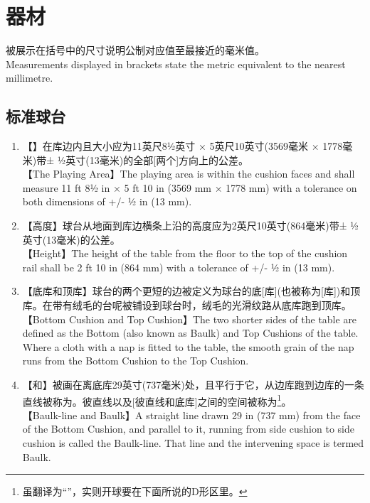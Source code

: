 \section{器材}\label{221}

\noindent 被展示在括号中的尺寸说明公制对应值至最接近的毫米值。\\
Measurements displayed in brackets state the metric equivalent to the nearest millimetre.

\subsection{标准球台}\label{2211}

\begin{enumerate}[label=(\alph*)]
    \item 【\playingarea{}】\playingarea{}在库边\face{}内且大小应为11英尺8½英寸 × 5英尺10英寸(3569毫米 × 1778毫米)带± ½英寸(13毫米)的全部[两个]方向上的公差。\\
    【The Playing Area】The playing area is within the cushion faces and shall measure 11 ft 8½ in × 5 ft 10 in (3569 mm × 1778 mm) with a tolerance on both dimensions of +/- ½ in (13 mm).
    \item 【高度】球台从地面到库边横条上沿的高度应为2英尺10英寸(864毫米)带± ½英寸(13毫米)的公差。\\
    【Height】The height of the table from the floor to the top of the cushion rail shall be 2 ft 10 in (864 mm) with a tolerance of +/- ½ in (13 mm).
    \item 【底库和顶库】球台的两个更短的边被定义为球台的底[库](也被称为\baulk{}[库])和顶库。在带有绒毛的台呢被铺设到球台时，绒毛的光滑纹路从底库跑到顶库。\\
    【Bottom Cushion and Top Cushion】The two shorter sides of the table are defined as the Bottom (also known as Baulk) and Top Cushions of the table. Where a cloth with a nap is fitted to the table, the smooth grain of the nap runs from the Bottom Cushion to the Top Cushion.
    \item 【\baulkline{}和\baulk{}】被画在离底库\face{}29英寸(737毫米)处，且平行于它，从边库跑到边库的一条直线被称为\baulkline{}。彼直线以及[彼直线和底库]之间的空间被称为\baulk{}\footnote{虽翻译为“\baulk{}”，实则开球要在下面所说的D形区里。}。\\
    【Baulk-line and Baulk】A straight line drawn 29 in (737 mm) from the face of the Bottom Cushion, and parallel to it, running from side cushion to side cushion is called the Baulk-line. That line and the intervening space is termed Baulk.

\end{enumerate}
